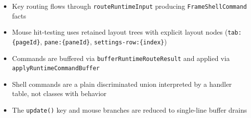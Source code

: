 \begin{itemize}
\tightlist
\item
  Key routing flows through \texttt{r\allowbreak{}o\allowbreak{}u\allowbreak{}t\allowbreak{}e\allowbreak{}R\allowbreak{}u\allowbreak{}n\allowbreak{}t\allowbreak{}i\allowbreak{}m\allowbreak{}e\allowbreak{}I\allowbreak{}n\allowbreak{}p\allowbreak{}u\allowbreak{}t} producing \texttt{F\allowbreak{}r\allowbreak{}a\allowbreak{}m\allowbreak{}e\allowbreak{}S\allowbreak{}h\allowbreak{}e\allowbreak{}l\allowbreak{}l\allowbreak{}C\allowbreak{}o\allowbreak{}m\allowbreak{}m\allowbreak{}a\allowbreak{}n\allowbreak{}d} facts
\item
  Mouse hit-testing uses retained layout trees with explicit layout nodes (\texttt{t\allowbreak{}a\allowbreak{}b\allowbreak{}:\allowbreak{}\{\allowbreak{}p\allowbreak{}a\allowbreak{}g\allowbreak{}e\allowbreak{}I\allowbreak{}d\allowbreak{}\}}, \texttt{p\allowbreak{}a\allowbreak{}n\allowbreak{}e\allowbreak{}:\allowbreak{}\{\allowbreak{}p\allowbreak{}a\allowbreak{}n\allowbreak{}e\allowbreak{}I\allowbreak{}d\allowbreak{}\}}, \texttt{s\allowbreak{}e\allowbreak{}t\allowbreak{}t\allowbreak{}i\allowbreak{}n\allowbreak{}g\allowbreak{}s\allowbreak{}-\allowbreak{}r\allowbreak{}o\allowbreak{}w\allowbreak{}:\allowbreak{}\{\allowbreak{}i\allowbreak{}n\allowbreak{}d\allowbreak{}e\allowbreak{}x\allowbreak{}\}})
\item
  Commands are buffered via \texttt{b\allowbreak{}u\allowbreak{}f\allowbreak{}f\allowbreak{}e\allowbreak{}r\allowbreak{}R\allowbreak{}u\allowbreak{}n\allowbreak{}t\allowbreak{}i\allowbreak{}m\allowbreak{}e\allowbreak{}R\allowbreak{}o\allowbreak{}u\allowbreak{}t\allowbreak{}e\allowbreak{}R\allowbreak{}e\allowbreak{}s\allowbreak{}u\allowbreak{}l\allowbreak{}t} and applied via \texttt{a\allowbreak{}p\allowbreak{}p\allowbreak{}l\allowbreak{}y\allowbreak{}R\allowbreak{}u\allowbreak{}n\allowbreak{}t\allowbreak{}i\allowbreak{}m\allowbreak{}e\allowbreak{}C\allowbreak{}o\allowbreak{}m\allowbreak{}m\allowbreak{}a\allowbreak{}n\allowbreak{}d\allowbreak{}B\allowbreak{}u\allowbreak{}f\allowbreak{}f\allowbreak{}e\allowbreak{}r}
\item
  Shell commands are a plain discriminated union interpreted by a handler table, not classes with behavior
\item
  The \texttt{u\allowbreak{}p\allowbreak{}d\allowbreak{}a\allowbreak{}t\allowbreak{}e\allowbreak{}(\allowbreak{})} key and mouse branches are reduced to single-line buffer drains
\end{itemize}

